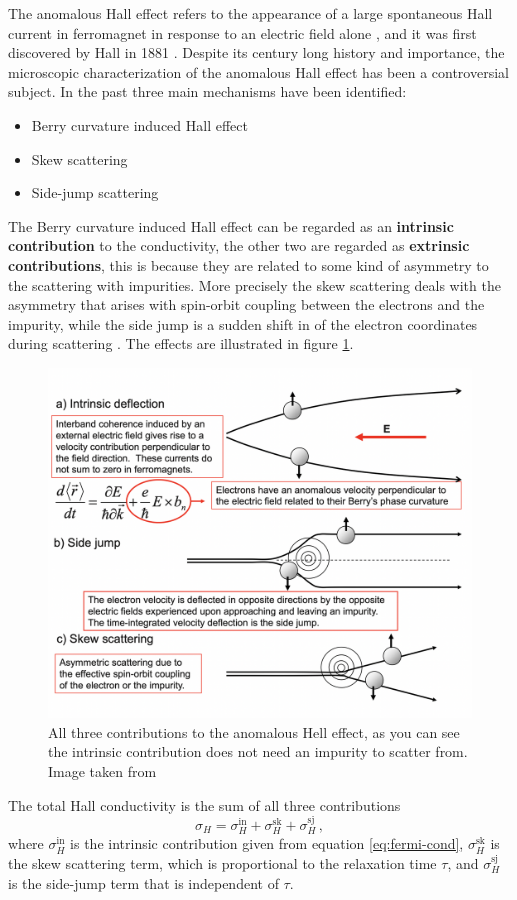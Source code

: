 The anomalous Hall effect refers to the appearance of a large spontaneous Hall current in ferromagnet in response to an electric field alone \cite{vanderbilt2018berry}, and it was first discovered by Hall in 1881 \cite{hall1881}. Despite its century long history and importance, the microscopic characterization of the anomalous Hall effect has been a controversial subject. In the past three main mechanisms have been identified:
\begin{itemize}
    \item Berry curvature induced Hall effect \cite{karplus1954hall}
    \item Skew scattering \cite{smith1958resonant}
    \item Side-jump scattering \cite{berger1970side}
\end{itemize}
The Berry curvature induced Hall effect can be regarded as an \textbf{intrinsic contribution} to the conductivity, the other two are regarded as \textbf{extrinsic contributions}, this is because they are related to some kind of asymmetry to the scattering with impurities. More precisely the skew scattering deals with the asymmetry that arises with spin-orbit coupling between the electrons and the impurity, while the side jump is a sudden shift in of the electron coordinates during scattering \cite{berger1970side}. The effects are illustrated in figure \ref{fig:anomalous-contributions}.
\begin{figure}
    \centering
    \includegraphics[width=.7\linewidth]{Immagini/ValleyHall/anomalous.png}
    \caption{All three contributions to the anomalous Hell effect, as you can see the intrinsic contribution does not need an impurity to scatter from. Image taken from \cite{nagaosa2010anomalous}}
    \label{fig:anomalous-contributions}
\end{figure}
The total Hall conductivity is the sum of all three contributions
\begin{equation}
    \sigma_H=\sigma_H^\textrm{in}+\sigma_H^\textrm{sk}+\sigma_H^\textrm{sj}\,,
\end{equation}
where $\sigma_H^\textrm{in}$ is the intrinsic contribution given from equation \ref{eq:fermi-cond}, $\sigma_H^\textrm{sk}$ is the skew scattering term, which is proportional to the relaxation time $\tau$, and $\sigma_H^\textrm{sj}$ is the side-jump term that is independent of $\tau$.

